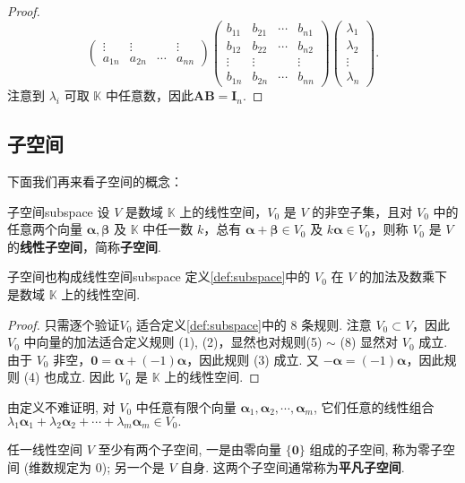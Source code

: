 \documentclass[12pt, a4paper,newtx]{ctexart}
\begin{document}
\begin{proof}
\[\begin{pmatrix}
		\vdots & \vdots & & \vdots \\
		a_{1n} & a_{2n} & \cdots & a_{nn}
	\end{pmatrix}
	\begin{pmatrix}
		b_{11} & b_{21} & \cdots & b_{n1} \\
		b_{12} & b_{22} & \cdots & b_{n2} \\
		\vdots & \vdots & & \vdots \\
		b_{1n} & b_{2n} & \cdots & b_{nn}
	\end{pmatrix}
	\begin{pmatrix}
		\lambda_1 \\
		\lambda_2 \\
		\vdots \\
		\lambda_n
	\end{pmatrix}.
	\]
	注意到 $ \lambda_i $ 可取 $ \mathbb{K} $ 中任意数，因此$\bm{AB} = \bm I_n. $
\end{proof}
\subsection{子空间}
下面我们再来看子空间的概念：
\begin{definition}{子空间}{subspace}\kaishu 
	设 $V$ 是数域 $\mathbb{K}$ 上的线性空间，$V_0$ 是 $V$ 的非空子集，且对 $V_0$ 中的任意两个向量 $\bm\alpha, \bm\beta$ 及 $\mathbb{K}$ 中任一数 $k$，总有 $\bm\alpha + \bm\beta \in V_0$ 及 $k\bm\alpha \in V_0$，则称 $V_0$ 是 $V$ 的\textbf{线性子空间}，简称\textbf{子空间}. 
\end{definition}
\begin{theorem}{子空间也构成线性空间}{subspace}
	定义\ref{def:subspace}中的 $V_0$ 在 $V$ 的加法及数乘下是数域 $\mathbb{K}$ 上的线性空间. 
\end{theorem}
\begin{proof}
	只需逐个验证$V_0$ 适合定义\ref{def:subspace}中的 8 条规则. 注意 $V_0\subset V$，因此 $V_0$ 中向量的加法适合定义规则 (1), (2)，显然也对规则(5) $\sim$ (8) 显然对 $V_0$ 成立. 由于 $V_0$ 非空，$\bm 0 = \bm\alpha + (-1)\bm\alpha$，因此规则 (3) 成立. 又 $-\bm\alpha = (-1)\bm\alpha$，因此规则 (4) 也成立. 因此 $V_0$ 是 $\mathbb{K}$ 上的线性空间. 
\end{proof}
由定义不难证明, 对 $V_0$ 中任意有限个向量 $\bm\alpha_1, \bm\alpha_2, \cdots, \bm\alpha_m$, 它们任意的线性组合$\lambda_1 \bm\alpha_1 + \lambda_2 \bm\alpha_2 + \cdots + \lambda_m \bm\alpha_m\in V_0.$

任一线性空间 $V$ 至少有两个子空间, 一是由零向量 $\{\bm 0\}$ 组成的子空间, 称为零子空间 (维数规定为 0); 另一个是 $V$ 自身. 这两个子空间通常称为\textbf{平凡子空间}.
\end{document}
